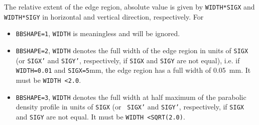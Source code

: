 {\begin{madlist}
    The relative extent of the edge region, absolute value is 
   given by {\tt WIDTH*SIGX} and {\tt WIDTH*SIGY} in horizontal and vertical 
   direction, respectively. 
     For 
     \begin{itemize}
       \item  {\tt BBSHAPE=1}, {\tt WIDTH} is meaningless and will be ignored.
       \item  {\tt BBSHAPE=2}, {\tt WIDTH} denotes the full width of the edge 
       region in units of {\tt SIGX} (or {\tt SIGX'} and {\tt SIGY'}, 
       respectively, if {\tt SIGX} and {\tt SIGY} are not equal), i.e. 
       if {\tt WIDTH=0.01} and {\tt SIGX=5}mm, the edge  region has a full 
       width of 0.05\ mm. It must be {\tt WIDTH \textless 2.0}.
       \item  {\tt BBSHAPE=3}, {\tt WIDTH} denotes the full width at half 
       maximum of the parabolic density profile in units of {\tt SIGX} (or {\tt 
       SIGX'} and {\tt SIGY'}, respectively, if {\tt SIGX} and {\tt SIGY} are 
       not equal. It must be {\tt WIDTH \textless SQRT(2.0)}.
     \end{itemize} 


\end{madlist}}
